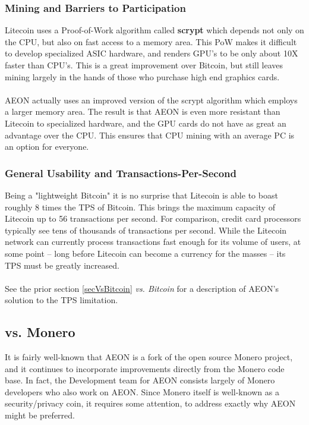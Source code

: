 \subsubsection{Mining and Barriers to Participation}
Litecoin uses a Proof-of-Work algorithm called \textbf{scrypt} which depends not only on the CPU, but also on fast access to a memory area.  This PoW makes it difficult to develop specialized ASIC hardware, and renders GPU's to be only about 10X faster than CPU's.  This is a great improvement over Bitcoin, but still leaves mining largely in the hands of those who purchase high end graphics cards.\\
\\
AEON actually uses an improved version of the scrypt algorithm which employs a larger memory area. The result is that AEON is even more resistant than Litecoin to specialized hardware, and the GPU cards do not have as great an advantage over the CPU.  This ensures that CPU mining with an average PC is an option for everyone.

\subsubsection{General Usability and Transactions-Per-Second}
Being a "lightweight Bitcoin" it is no surprise that Litecoin is able to boast roughly 8 times the TPS of Bitcoin.  This brings the maximum capacity of Litecoin up to 56 transactions per second. For comparison, credit card processors typically see tens of thousands of transactions per second. While the Litecoin network can currently process transactions fast enough for its volume of users, at some point -- long before Litecoin can become a currency for the masses -- its TPS must be greatly increased.\\
\\
See the prior section \ref{secVsBitcoin} \textit{vs. Bitcoin} for a description of AEON's solution to the TPS limitation.

\subsection{vs. Monero}
It is fairly well-known that AEON is a fork of the open source Monero project, and it continues to incorporate improvements directly from the Monero code base.  In fact, the Development team for AEON consists largely of Monero developers who also work on AEON.  Since Monero itself is well-known as a security/privacy coin, it requires some attention, to address exactly why AEON might be preferred.

